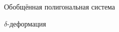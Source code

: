 \documentclass[aspectratio=1610, 10pt, notheorems]{beamer}
\begin{document}
\begin{frame}{Обобщённая полигональная система}

\end{frame}


\begin{frame}{$\delta$-деформация}

\end{frame}


\begin{frame}{}

\end{frame}


\begin{frame}{}

\end{frame}


\begin{frame}{}

\end{frame}


\begin{frame}{}

\end{frame}


\begin{frame}{}

\end{frame}


\begin{frame}{}

\end{frame}


\begin{frame}{}

\end{frame}


\begin{frame}{}

\end{frame}


\begin{frame}{}

\end{frame}


\begin{frame}{}

\end{frame}


\begin{frame}{}

\end{frame}


\begin{frame}{}

\end{frame}
\end{document}
